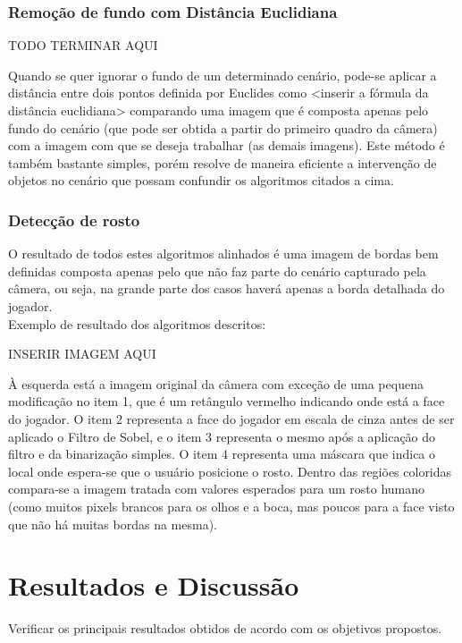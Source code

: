 \documentclass{sciposter}
\begin{document}
\begin{multicols}{3}
\subsubsection{Remoção de fundo com Distância Euclidiana}

TODO TERMINAR AQUI

Quando se quer ignorar o fundo de um determinado cenário, pode-se aplicar a distância entre dois pontos definida por Euclides como <inserir a fórmula da distância euclidiana> comparando uma imagem que é composta apenas pelo fundo do cenário (que pode ser obtida a partir do primeiro quadro da câmera) com a imagem com que se deseja trabalhar (as demais imagens).
Este método é também bastante simples, porém resolve de maneira eficiente a intervenção de objetos no cenário que possam confundir os algoritmos citados a cima.

\subsubsection{Detecção de rosto}
O resultado de todos estes algoritmos alinhados é uma imagem de bordas bem definidas composta apenas pelo que não faz parte do cenário capturado pela câmera, ou seja, na grande parte dos casos haverá apenas a borda detalhada do jogador. \\

Exemplo de resultado dos algoritmos descritos:

INSERIR IMAGEM AQUI

À esquerda está a imagem original da câmera com exceção de uma pequena modificação no item 1, que é um retângulo vermelho indicando onde está a face do jogador. O item 2 representa a face do jogador em escala de cinza antes de ser aplicado o Filtro de Sobel, e o item 3 representa o mesmo após a aplicação do filtro e da binarização simples. O item 4 representa uma máscara que indica o local onde espera-se que o usuário posicione o rosto. Dentro das regiões coloridas compara-se a imagem tratada com valores esperados para um rosto humano (como muitos pixels brancos para os olhos e a boca, mas poucos para a face visto que não há muitas bordas na mesma).

\section{Resultados e Discussão}

Verificar os principais resultados obtidos de acordo com os objetivos propostos.\\


\end{multicols}
\end{document}
